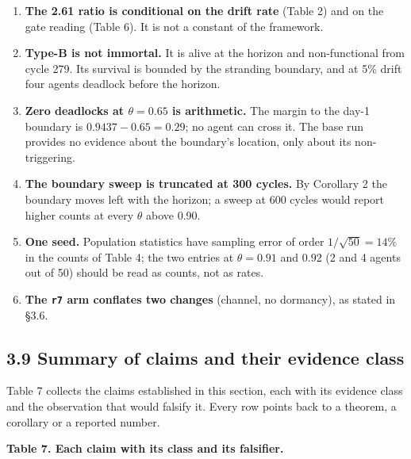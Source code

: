 \documentclass[11pt,a4paper]{article}
\providecommand{\tightlist}{\setlength{\itemsep}{0pt}\setlength{\parskip}{0pt}}
\begin{document}
\begin{enumerate}
\def\labelenumi{\arabic{enumi}.}
\tightlist
\item
  \textbf{The 2.61 ratio is conditional on the drift rate} (Table 2) and on the gate
  reading (Table 6). It is not a constant of the framework.
\item
  \textbf{Type-B is not immortal.} It is alive at the horizon and non-functional from
  cycle 279. Its survival is bounded by the stranding boundary, and at 5\% drift
  four agents deadlock before the horizon.
\item
  \textbf{Zero deadlocks at \(\theta=0.65\) is arithmetic.} The margin to the day-1
  boundary is \(0.9437-0.65=0.29\); no agent can cross it. The base run provides no
  evidence about the boundary's location, only about its non-triggering.
\item
  \textbf{The boundary sweep is truncated at 300 cycles.} By Corollary 2 the boundary
  moves left with the horizon; a sweep at 600 cycles would report higher counts
  at every \(\theta\) above 0.90.
\item
  \textbf{One seed.} Population statistics have sampling error of order
  \(1/\sqrt{50}=14\%\) in the counts of Table 4; the two entries at \(\theta=0.91\)
  and \(0.92\) (2 and 4 agents out of 50) should be read as counts, not as rates.
\item
  \textbf{The \texttt{r7} arm conflates two changes} (channel, no dormancy), as stated in
  §3.6.
\end{enumerate}

\subsection{3.9 Summary of claims and their evidence class}\label{summary-of-claims-and-their-evidence-class}

Table 7 collects the claims established in this section, each with its evidence
class and the observation that would falsify it. Every row points back to a
theorem, a corollary or a reported number.

\textbf{Table 7. Each claim with its class and its falsifier.}
\end{document}

